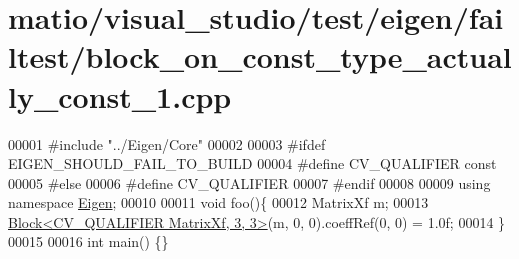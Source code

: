 \hypertarget{matio_2visual__studio_2test_2eigen_2failtest_2block__on__const__type__actually__const__1_8cpp_source}{}\section{matio/visual\+\_\+studio/test/eigen/failtest/block\+\_\+on\+\_\+const\+\_\+type\+\_\+actually\+\_\+const\+\_\+1.cpp}
\label{matio_2visual__studio_2test_2eigen_2failtest_2block__on__const__type__actually__const__1_8cpp_source}

\begin{DoxyCode}
00001 \textcolor{preprocessor}{#include "../Eigen/Core"}
00002 
00003 \textcolor{preprocessor}{#ifdef EIGEN\_SHOULD\_FAIL\_TO\_BUILD}
00004 \textcolor{preprocessor}{#define CV\_QUALIFIER const}
00005 \textcolor{preprocessor}{#else}
00006 \textcolor{preprocessor}{#define CV\_QUALIFIER}
00007 \textcolor{preprocessor}{#endif}
00008 
00009 \textcolor{keyword}{using namespace }\hyperlink{namespace_eigen}{Eigen};
00010 
00011 \textcolor{keywordtype}{void} foo()\{
00012     MatrixXf m;
00013     \hyperlink{group___core___module_class_eigen_1_1_block}{Block<CV\_QUALIFIER MatrixXf, 3, 3>}(m, 0, 0).coeffRef(0, 0) = 1.0f;
00014 \}
00015 
00016 \textcolor{keywordtype}{int} main() \{\}
\end{DoxyCode}
